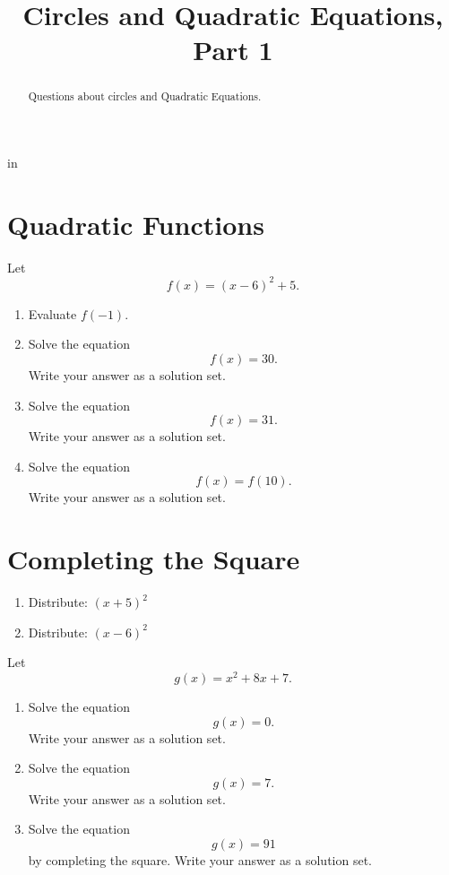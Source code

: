 \documentclass{ximera}
\title{Circles and Quadratic Equations, Part 1}
\newcommand{\pskip}{\vskip 0.1 in}
\begin{document}
\begin{abstract}
Questions about circles and Quadratic Equations.
\end{abstract}
\maketitle


\pskip

\section{Quadratic Functions}

\begin{question} \label{Qdffrp3r}
Let 
\[
   f(x) = (x-6)^2 + 5 .
\]
\begin{enumerate}

\item Evaluate $f(-1)$.

\item Solve the equation 
\[
             f(x) = 30 .
\]
Write your answer as a solution set. 

\item Solve the equation 
\[
       f(x) = 31 .
\]
Write your answer as a solution set. 

\item Solve the equation
\[
      f(x) = f(10).
\]
Write your answer as a solution set.  


\end{enumerate}
\end{question}


\section{Completing the Square}

\begin{question} \label{Qldf3fr3fd}

\begin{enumerate}
\item Distribute: $(x+5)^2$

\item Distribute: $(x-6)^2$
\end{enumerate}
\end{question}

\begin{question} \label{Q9r3mmzzzz}
Let
\[
       g(x) = x^2 + 8x + 7 .
\]
\begin{enumerate}
\item Solve the equation
\[
    g(x) = 0 .
\]
Write your answer as a solution set.

\item Solve the equation
\[
    g(x) = 7 .
\]
Write your answer as a solution set.

\item Solve the equation
\[
    g(x) = 91 
\]
by completing the square. Write your answer as a solution set.

\end{enumerate}
\end{question}
\end{document}
